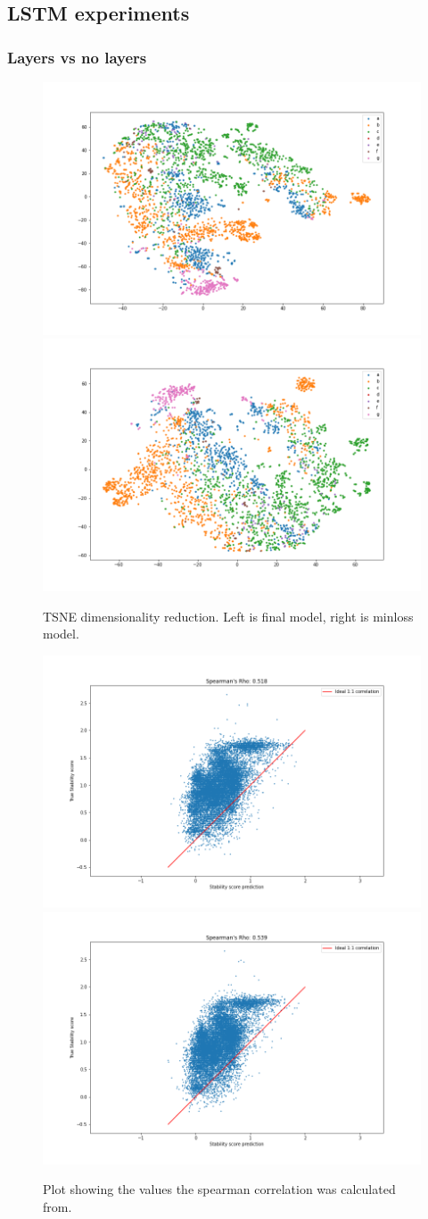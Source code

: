 \subsection{LSTM experiments}

\subsubsection{Layers vs no layers}


\begin{figure}[!ht]
  \centering
  \includegraphics[width=0.4\linewidth]{latex/imgs/tsne_2_layer_05_drop_final.png}
  \includegraphics[width=0.4\linewidth]{latex/imgs/tsne_2_layer_05_drop_minloss.png}
  \caption{TSNE dimensionality reduction. Left is final model, right is minloss model.}
\end{figure}
\begin{figure}[!ht]
  \centering
  \includegraphics[width=0.4\linewidth]{latex/imgs/spearman_2_layer_05_drop_final.png}
  \includegraphics[width=0.4\linewidth]{latex/imgs/spearman_2_layer_05_drop_minloss.png}
  \caption{Plot showing the values the spearman correlation was calculated from.}
\end{figure}



